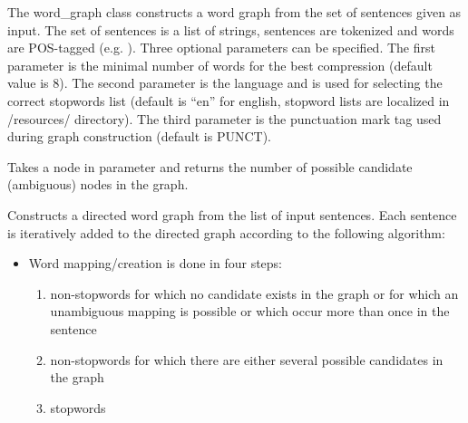 \documentclass[letterpaper,10pt,english]{sphinxmanual}
\begin{document}
\begin{fulllineitems}
\label{index:takahe.word_graph}
The word\_graph class constructs a word graph from the set of sentences given
as input. The set of sentences is a list of strings, sentences are tokenized
and words are POS-tagged (e.g. ). 
Three optional parameters can be specified. The first parameter is the 
minimal number of words for the best compression (default value is 8). The 
second parameter is the language and is used for selecting the correct 
stopwords list (default is ``en'' for english, stopword lists are localized in 
/resources/ directory). The third parameter is the punctuation mark tag 
used during graph construction (default is PUNCT).

\begin{fulllineitems}
\label{index:takahe.word_graph.ambiguous_nodes}
Takes a node in parameter and returns the number of possible candidate 
(ambiguous) nodes in the graph.

\end{fulllineitems}


\begin{fulllineitems}
\label{index:takahe.word_graph.build_graph}
Constructs a directed word graph from the list of input sentences. Each
sentence is iteratively added to the directed graph according to the 
following algorithm:
\begin{itemize}
\item {} 
Word mapping/creation is done in four steps:
\begin{enumerate}
\item {} 
non-stopwords for which no candidate exists in the graph or for 
which an unambiguous mapping is possible or which occur more than
once in the sentence

\item {} 
non-stopwords for which there are either several possible
candidates in the graph

\item {} 
stopwords


\end{enumerate}
\end{itemize}
\end{fulllineitems}
\end{fulllineitems}
\end{document}

